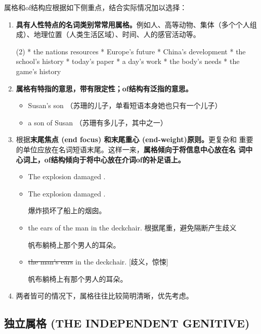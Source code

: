 属格和of结构应根据如下侧重点，结合实际情况加以选择：
\begin{enumerate}
\item \textbf{具有人性特点的名词类别常常用属格。}例如人、高等动物、集体（多个个人组
  成）、地理位置（人类生活区域）、时间、人的感官活动等。
  \begin{taskitem}(2)
    * the nations resources
    * Europe's future
    * China's development
    * the school's history
    * today's paper
    * a day's work
    * the body's needs
    * the game's history
  \end{taskitem}

\item \textbf{属格有特指的意思，带有限定性；of结构有泛指的意思。}
  \begin{itemize}
  \item Susan's son （苏珊的儿子，单看短语本身她也只有一个儿子）

  \item a son of Susan （苏珊有多儿子，其中之一）
  \end{itemize}

\item 根据\textbf{末尾焦点 (end focus) 和末尾重心 (end-weight)原则。}更复杂和
  重要的单位应放在名词短语末尾。这样一来，\textbf{属格倾向于将信息中心放在名
    词中心词上，of结构倾向于将中心放在介词of的补足语上。}

  \begin{itemize}
  \item The explosion damaged .
  \item The explosion damaged .

    爆炸损坏了船上的烟囱。

  \item the ears of the man in the deckchair. 根据尾重，避免隔断产生歧义

    帆布躺椅上那个男人的耳朵。
  \item \sout{the man's ears} in the deckchair. [歧义，惊悚]

    帆布躺椅上有那个男人的耳朵。
  \end{itemize}

\item 两者皆可的情况下，属格往往比较简明清晰，优先考虑。
\end{enumerate}

\subsection{独立属格 (THE INDEPENDENT GENITIVE)}

